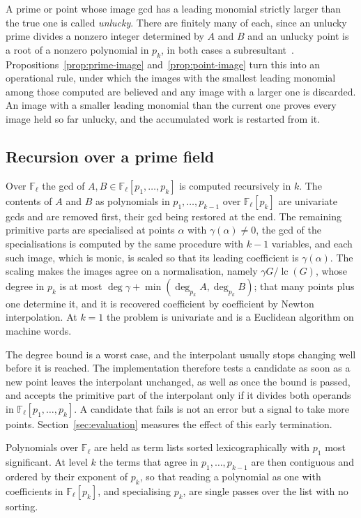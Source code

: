 \documentclass[11pt,a4paper]{article}
\theoremstyle{plain}
\theoremstyle{definition}
\theoremstyle{remark}
\newcommand{\FF}{\mathbb{F}}
\begin{document}
A prime or point whose image gcd has a leading monomial strictly larger than the true one is called
\emph{unlucky}. There are finitely many of each, since an unlucky prime divides a nonzero integer determined by
$A$ and $B$ and an unlucky point is a root of a nonzero polynomial in $p_k$, in both cases a
subresultant~\cite{brown1971}. Propositions~\ref{prop:prime-image} and~\ref{prop:point-image} turn this
into an operational rule, under which the images with the smallest leading monomial among those
computed are believed and any image with a larger one is discarded. An image with a smaller leading monomial than
the current one proves every image held so far unlucky, and the accumulated work is restarted from it.

\subsection{Recursion over a prime field}

Over $\FF_\ell$ the gcd of $A, B \in \FF_\ell[p_1,\dots,p_k]$ is computed recursively in $k$. The
contents of $A$ and $B$ as polynomials in $p_1,\dots,p_{k-1}$ over $\FF_\ell[p_k]$ are univariate gcds
and are removed first, their gcd being restored at the end. The remaining primitive parts are
specialised at points $\alpha$ with $\gamma(\alpha) \neq 0$, the gcd of the specialisations is computed
by the same procedure with $k-1$ variables, and each such image, which is monic, is scaled so that its
leading coefficient is $\gamma(\alpha)$. The scaling makes the images agree on a normalisation, namely
$\gamma G / \operatorname{lc}(G)$, whose degree in $p_k$ is at most
$\deg \gamma + \min(\deg_{p_k} A, \deg_{p_k} B)$; that many points plus one determine it, and it is
recovered coefficient by coefficient by Newton interpolation. At $k = 1$ the problem is univariate and
is a Euclidean algorithm on machine words.

The degree bound is a worst case, and the interpolant usually stops changing well before it is
reached. The implementation therefore tests a candidate as soon as a new point leaves the
interpolant unchanged, as well as once the bound is passed, and accepts the primitive part of the
interpolant only if it divides both operands in $\FF_\ell[p_1,\dots,p_k]$. A candidate that fails is
not an error but a signal to take more points. Section~\ref{sec:evaluation} measures the effect of
this early termination.

Polynomials over $\FF_\ell$ are held as term lists sorted lexicographically with $p_1$ most
significant. At level $k$ the terms that agree in $p_1,\dots,p_{k-1}$ are then contiguous and ordered
by their exponent of $p_k$, so that reading a polynomial as one with coefficients in $\FF_\ell[p_k]$,
and specialising $p_k$, are single passes over the list with no sorting.
\end{document}
